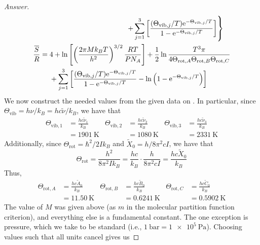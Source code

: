 \documentclass[../psets.tex]{subfiles}
\begin{document}
\begin{enumerate}
\begin{proof}[Answer]
\begin{align*}
\begin{split}
                & \left. +\sum_{j=1}^3\left[ \frac{(\Theta_{\text{vib},j}/T)\e[-\Theta_{\text{vib},j}/T]}{1-\e[-\Theta_{\text{vib},j}/T]} \right] \right\}
            \end{split}\\
            \begin{split}
                \frac{\overline{S}}{R} ={}& 4+\ln\left[ \left( \frac{2\pi Mk_BT}{h^2} \right)^{3/2}\frac{RT}{PN_A} \right]+\frac{1}{2}\ln\frac{T^3\pi}{4\Theta_{\text{rot},A}\Theta_{\text{rot},B}\Theta_{\text{rot},C}}\\
                & +\sum_{j=1}^3\left[ \frac{(\Theta_{\text{vib},j}/T)\e[-\Theta_{\text{vib},j}/T]}{1-\e[-\Theta_{\text{vib},j}/T]}-\ln\left( 1-\e[-\Theta_{\text{vib},j}/T] \right) \right]
            \end{split}
        \end{align*}
        We now construct the needed values from the given data on . In particular, since $\Theta_\text{vib}=h\nu/k_B=hc\tilde{\nu}/k_B$, we have that
        \begin{align*}
            \Theta_{\text{vib},1} &= \frac{hc\tilde{\nu}_1}{k_B}&
                \Theta_{\text{vib},2} &= \frac{hc\tilde{\nu}_2}{k_B}&
                    \Theta_{\text{vib},3} &= \frac{hc\tilde{\nu}_3}{k_B}\\
            &= \SI{1901}{\kelvin}&
                &= \SI{1080}{\kelvin}&
                    &= \SI{2331}{\kelvin}
        \end{align*}
        Additionally, since $\Theta_\text{rot}=\hbar^2/2Ik_B$ and $\tilde{X}_0=h/8\pi^2cI$, we have that
        \begin{equation*}
            \Theta_\text{rot} = \frac{h^2}{8\pi^2Ik_B}
            = \frac{hc}{k_B}\cdot\frac{h}{8\pi^2cI}
            = \frac{hc\tilde{X}_0}{k_B}
        \end{equation*}
        Thus,
        \begin{align*}
            \Theta_{\text{rot},A} &= \frac{hc\tilde{A}_0}{k_B}&
                \Theta_{\text{rot},B} &= \frac{hc\tilde{B}_0}{k_B}&
                    \Theta_{\text{rot},C} &= \frac{hc\tilde{C}_0}{k_B}\\
            &= \SI{11.50}{\kelvin}&
                &= \SI{0.6241}{\kelvin}&
                    &= \SI{0.5902}{\kelvin}
        \end{align*}
        The value of $M$ was given above (as $m$ in the molecular partition function criterion), and everything else is a fundamental constant. The one exception is pressure, which we take to be standard (i.e., $\SI{1}{\bar}=\SI{1e5}{\pascal}$). Choosing values such that all units cancel gives us

\end{proof}
\end{enumerate}
\end{document}
